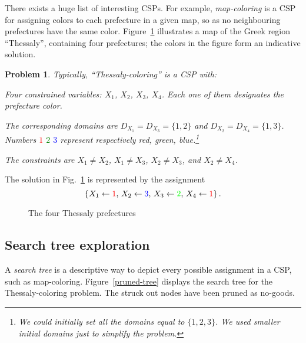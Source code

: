 \documentclass{ws-ijait}
\newtheorem{problem}{Problem}
\begin{document}
There exists a huge list of interesting CSPs.\cite{CSPLib}
For example, \emph{map-coloring} is a CSP for assigning
colors to each prefecture in a given map, so as no
neighbouring prefectures have the same color.
Figure~\ref{map-colored} illustrates a map of the Greek
region ``Thessaly'', containing four prefectures; the colors
in the figure form an indicative solution.
\begin{problem}
  \label{thessaly-coloring}
  Typically, \emph{``Thessaly-coloring''} is a CSP with:
  \begin{romanlist}
    \item Four constrained variables: $X_1$, $X_2$, $X_3$,
          $X_4$. Each one of them designates the prefecture
          color.
    \item The corresponding domains are $D_{X_1} = D_{X_3} =
          \{1,2\}$ and $D_{X_2} = D_{X_4} = \{1,3\}$.
          Numbers \textcolor{red}{$1$}
          \textcolor{green}{$2$} \textcolor{blue}{$3$}
          represent respectively red, green,
          blue.\footnote{We could initially set all the
          domains equal to $\{1, 2, 3\}$. We used smaller
          initial domains just to simplify the problem.}
    \item The constraints are $X_1 \neq X_2$, $X_1 \neq
          X_3$, $X_2 \neq X_3$, and $X_2 \neq X_4$.
  \end{romanlist}
\end{problem}
The solution in Fig.~\ref{map-colored} is represented by the
assignment
\begin{equation}
  \label{solution}
  \{ X_1 \gets \textcolor{red}{1}, \, X_2 \gets
  \textcolor{blue}{3}, \, X_3 \gets \textcolor{green}{2}, \,
  X_4 \gets \textcolor{red}{1} \} \, .
\end{equation}

\begin{figure}
  \centering
  
  \caption{The four Thessaly prefectures\label{map-colored}}
\end{figure}

\subsection{Search tree exploration}

A \emph{search tree} is a descriptive way to depict every
possible assignment in a CSP, such as map-coloring.
Figure~\ref{pruned-tree} displays the search tree for the
Thessaly-coloring problem. The struck out nodes have been
pruned as no-goods.
\end{document}
